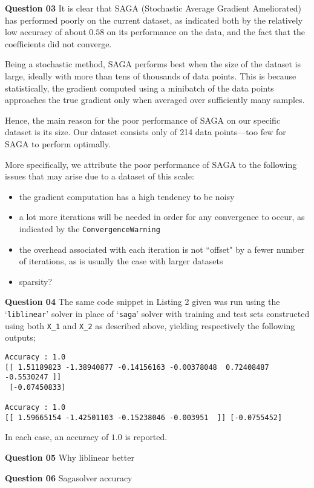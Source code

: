 \documentclass{article}[a4paper]
\begin{document}
	\textbf{Question 03} It is clear that SAGA (Stochastic Average Gradient Ameliorated) has performed poorly on the current dataset, as indicated both by the relatively low accuracy of about $0.58$ on its performance on the data, and the fact that the coefficients did not converge.

	Being a stochastic method, SAGA performs best when the size of the dataset is large, ideally with more than tens of thousands of data points. This is because statistically, the gradient computed using a minibatch of the data points approaches the true gradient only when averaged over sufficiently many samples.

	Hence, the main reason for the poor performance of SAGA on our specific dataset is its size. Our dataset consists only of 214 data points---too few for SAGA to perform optimally.
	
	More specifically, we attribute the poor performance of SAGA to the following issues that may arise due to a dataset of this scale:
	\begin{itemize}[noitemsep]
		\item the gradient computation has a high tendency to be noisy
		\item a lot more iterations will be needed in order for any convergence to occur, as indicated by the \texttt{ConvergenceWarning}\item the overhead associated with each iteration is not ``offset" by a fewer number of iterations, as is usually the case with larger datasets
		\item sparsity?
	\end{itemize}
	\medskip
	
	\textbf{Question 04} The same code snippet in Listing 2 given was run using the `\texttt{liblinear}' solver in place of `\texttt{saga}' solver with training and test sets constructed using both \texttt{X\_1} and \texttt{X\_2} as described above, yielding respectively the following outputs;
	\begin{verbatim}
Accuracy : 1.0
[[ 1.51189823 -1.38940877 -0.14156163 -0.00378048  0.72408487 -0.5530247 ]]
 [-0.07450833]

Accuracy : 1.0
[[ 1.59665154 -1.42501103 -0.15238046 -0.003951  ]] [-0.0755452]
\end{verbatim}
	In each case, an accuracy of $1.0$ is reported.
	\medskip

	\textbf{Question 05} Why liblinear better
	\medskip

	\textbf{Question 06} Sagasolver accuracy
	\medskip
\end{document}
